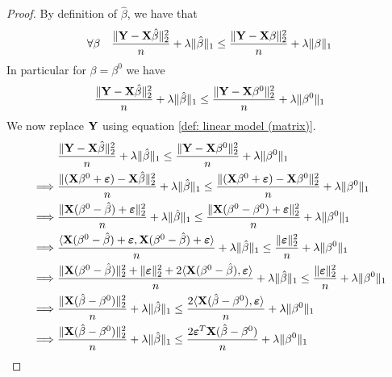 \begin{proof}
    By definition of $\hat \beta$, we have that
    $$
        \forall \beta \quad \frac{\| \mathbf{Y}-\mathbf{X} \hat \beta \|_{2}^{2}}{n} + \lambda \| \hat \beta \|_{1} \leq \frac{\|\mathbf{Y}-\mathbf{X} \beta \|_{2}^{2}}{n}+\lambda \| \beta \|_{1}
    $$
    In particular for $\beta = \beta^0$ we have
    $$
        \frac{\| \mathbf{Y}-\mathbf{X} \hat \beta \|_{2}^{2}}{n}+\lambda\| \hat \beta \|_{1} \leq \frac{ \| \mathbf{Y}-\mathbf{X} \beta^0\|_{2}^{2}}{n}+\lambda \| \beta^0\|_{1}
    $$
    We now replace $\mathbf{Y}$ using equation \eqref{def: linear model (matrix)}.
    \begin{align*}
                 & \frac{\|\mathbf{Y}  - \mathbf{X} \hat{\beta} \|_{2}^{2}}{n} + \lambda \| \hat{\beta}\|_{1} \leq \frac{\| \mathbf{Y}  - \mathbf{X} \beta^0 \|_2^2}{n}+\lambda\|\beta^{0}\|_{1}                                                       \\
        \implies &
        \frac{\| (\mathbf{X} \beta^0 + \boldsymbol{\varepsilon}) - \mathbf{X} \hat \beta \|_{2}^{2}}{n}+\lambda\| \hat \beta \|_{1} \leq \frac{ \| (\mathbf{X} \beta^0 + \boldsymbol{\varepsilon})-\mathbf{X} \beta^0\|_{2}^{2}}{n}+\lambda \| \beta^0\|_{1}                                   \\
        \implies &
        \frac{\| \mathbf{X} ( \beta^0 - \hat \beta) + \boldsymbol{\varepsilon} \|_{2}^{2}}{n} + \lambda\| \hat \beta \|_{1} \leq \frac{ \| \mathbf{X} ( \beta^0 - \beta^0) + \boldsymbol{\varepsilon} \|_{2}^{2}}{n}+\lambda \| \beta^0\|_{1}                                  \\
        \implies &
        \frac{\langle \mathbf{X} ( \beta^0 - \hat \beta) + \boldsymbol{\varepsilon}, \mathbf{X} ( \beta^0 - \hat \beta) + \boldsymbol{\varepsilon} \rangle}{n}+\lambda \| \hat \beta \|_{1} \leq \frac{ \| \boldsymbol{\varepsilon} \|_{2}^{2}}{n}+\lambda \| \beta^0\|_{1}                        \\
        \implies &
        \frac{\| \mathbf{X} (\beta^0 - \hat \beta) \| _2^2 + \| \boldsymbol{\varepsilon} \|_2^2 + 2 \langle \mathbf{X} ( \beta^0 - \hat \beta),  \boldsymbol{\varepsilon} \rangle}{n}+\lambda \| \hat \beta \|_{1} \leq \frac{ \| \boldsymbol{\varepsilon} \|_{2}^{2}}{n}+\lambda \| \beta^0\|_{1} \\
        \implies &
        \frac{\| \mathbf{X} (\hat \beta - \beta^0) \| _2^2}{n} + \lambda \| \hat \beta \|_{1} \leq \frac{2 \langle \mathbf{X} ( \hat \beta - \beta^0),  \boldsymbol{\varepsilon} \rangle}{n} + \lambda \| \beta^0\|_{1}                                    \\
        \implies &
        \frac{\| \mathbf{X} (\hat \beta - \beta^0) \| _2^2}{n} + \lambda \| \hat \beta \|_{1} \leq \frac{2 \boldsymbol{\varepsilon}^T \mathbf{X} ( \hat \beta - \beta^0)}{n} + \lambda \| \beta^0\|_{1}                                                    \\
    \end{align*}
\end{proof}

